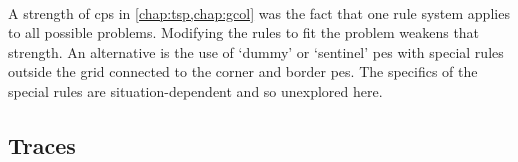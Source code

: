 \begin{cprulesetfloat}
    \begin{cpruleset}
        
        \\
        
        
    \end{cpruleset}
    \caption[Alternative forms of \cref{ruleset:nmp:proxspec}'s rule 3]{\label{ruleset:nmp:3alts}Alternative forms of \cref{ruleset:nmp:proxspec}'s  for \glspl{pe} on the border of a grid or in the corner of a grid, respectively}
\end{cprulesetfloat}

A strength of \gls{cps} in \cref{chap:tsp,chap:gcol} was the fact that one rule system applies to all possible problems.  Modifying the rules to fit the problem weakens that strength.  An alternative is the use of `dummy' or `sentinel' \glspl{pe} with special rules outside the grid connected to the corner and border \glspl{pe}.  The specifics of the special rules are situation-dependent and so unexplored here.

\subsection{Traces}


